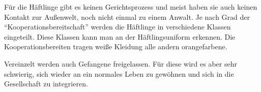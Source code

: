 Für die Häftlinge gibt es keinen Gerichtsprozess und meist haben sie auch keinen Kontakt zur Außenwelt,
noch nicht einmal zu einem Anwalt. Je nach Grad der \enquote{Kooperationsbereitschaft} werden die
Häftlinge in verschiedene Klassen eingeteilt. Diese Klassen kann man an der Häftlingsuniform
erkennen. Die Kooperationsbereiten tragen weiße Kleidung alle andern orangefarbene.

Vereinzelt werden auch Gefangene freigelassen. Für diese wird es aber sehr schwierig, sich wieder an
ein normales Leben zu gewöhnen und sich in die Gesellschaft zu integrieren.

